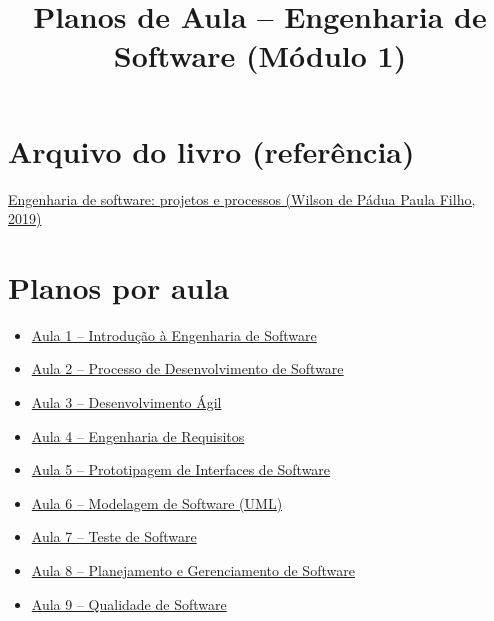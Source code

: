 \documentclass[12pt,a4paper]{article}
\title{Planos de Aula -- Engenharia de Software (Módulo 1)}
\date{}
\begin{document}
\maketitle

\section*{Arquivo do livro (referência)}
\noindent
\href{../99-Materiais/Engenharia%20de%20software%20projetos%20e%20processos%20by%20Wilson%20de%20P%C3%A1dua%20Paula%20Filho%20.epub.pdf}{Engenharia de software: projetos e processos (Wilson de Pádua Paula Filho, 2019)}

\section*{Planos por aula}
\begin{itemize}[leftmargin=*,itemsep=0.35em]
  \item \href{A01_Plano_de_Aula_Introducao_Engenharia_de_Software.pdf}{Aula 1 -- Introdução à Engenharia de Software}
  \item \href{A02_Plano_de_Aula_Processo_de_Desenvolvimento_de_Software.pdf}{Aula 2 -- Processo de Desenvolvimento de Software}
  \item \href{A03_Plano_de_Aula_Desenvolvimento_Agil.pdf}{Aula 3 -- Desenvolvimento Ágil}
  \item \href{A04_Plano_de_Aula_Engenharia_de_Requisitos.pdf}{Aula 4 -- Engenharia de Requisitos}
  \item \href{A05_Plano_de_Aula_Prototipagem_de_Interfaces.pdf}{Aula 5 -- Prototipagem de Interfaces de Software}
  \item \href{A06_Plano_de_Aula_Modelagem_de_Software_UML.pdf}{Aula 6 -- Modelagem de Software (UML)}
  \item \href{A07_Plano_de_Aula_Teste_de_Software.pdf}{Aula 7 -- Teste de Software}
  \item \href{A08_Plano_de_Aula_Planejamento_e_Gerenciamento_de_Software.pdf}{Aula 8 -- Planejamento e Gerenciamento de Software}
  \item \href{A09_Plano_de_Aula_Qualidade_de_Software.pdf}{Aula 9 -- Qualidade de Software}
\end{itemize}
\end{document}
